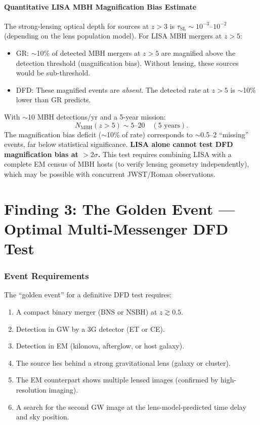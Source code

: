 \documentclass[11pt]{article}
\theoremstyle{definition}
\theoremstyle{remark}
\begin{document}
\subsection{Quantitative LISA MBH Magnification Bias Estimate}

The strong-lensing optical depth for sources at $z > 3$ is
$\tau_{\mathrm{SL}} \sim 10^{-3}$--$10^{-2}$ (depending on the lens
population model). For LISA MBH mergers at $z > 5$:
\begin{itemize}[nosep]
\item GR: $\sim$10\% of detected MBH mergers at $z > 5$ are magnified
  above the detection threshold (magnification bias). Without lensing,
  these sources would be sub-threshold.
\item DFD: These magnified events are \emph{absent}. The detected rate
  at $z > 5$ is $\sim$10\% lower than GR predicts.
\end{itemize}

With $\sim$10 MBH detections/yr and a 5-year mission:
\begin{equation}
N_{\mathrm{MBH}}(z > 5) \sim 5\text{--}20 \quad (\text{5 years}).
\end{equation}
The magnification bias deficit ($\sim$10\% of rate) corresponds to
$\sim$0.5--2 ``missing'' events, far below statistical significance.
\textbf{LISA alone cannot test DFD magnification bias at $>2\sigma$.}
This test requires combining LISA with a complete EM census of MBH
hosts (to verify lensing geometry independently), which may be possible
with concurrent JWST/Roman observations.


\part{Finding 3: The Golden Event --- Optimal Multi-Messenger DFD Test}
\label{part:golden}

\section{Event Requirements}

The ``golden event'' for a definitive DFD test requires:
\begin{enumerate}[nosep]
\item A compact binary merger (BNS or NSBH) at $z \gtrsim 0.5$.
\item Detection in GW by a 3G detector (ET or CE).
\item Detection in EM (kilonova, afterglow, or host galaxy).
\item The source lies behind a strong gravitational lens (galaxy or cluster).
\item The EM counterpart shows multiple lensed images (confirmed by
  high-resolution imaging).
\item A search for the second GW image at the lens-model-predicted
  time delay and sky position.
\end{enumerate}
\end{document}
